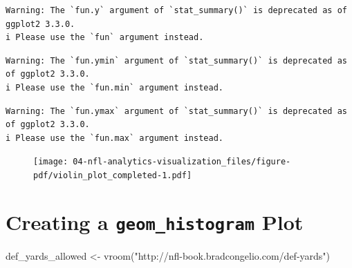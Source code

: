 \documentclass[
  letterpaper,
]{krantz}
\newenvironment{Shaded}{\begin{snugshade}}{\end{snugshade}}
\newcommand{\FunctionTok}[1]{\textcolor[rgb]{0.28,0.35,0.67}{#1}}
\newcommand{\NormalTok}[1]{\textcolor[rgb]{0.00,0.23,0.31}{#1}}
\newcommand{\OtherTok}[1]{\textcolor[rgb]{0.00,0.23,0.31}{#1}}
\newcommand{\StringTok}[1]{\textcolor[rgb]{0.13,0.47,0.30}{#1}}
\begin{document}
\begin{verbatim}
Warning: The `fun.y` argument of `stat_summary()` is deprecated as of ggplot2 3.3.0.
i Please use the `fun` argument instead.
\end{verbatim}

\begin{verbatim}
Warning: The `fun.ymin` argument of `stat_summary()` is deprecated as of ggplot2 3.3.0.
i Please use the `fun.min` argument instead.
\end{verbatim}

\begin{verbatim}
Warning: The `fun.ymax` argument of `stat_summary()` is deprecated as of ggplot2 3.3.0.
i Please use the `fun.max` argument instead.
\end{verbatim}

\begin{figure}[H]

{\centering \texttt{[image: 04-nfl-analytics-visualization\_files/figure-pdf/violin\_plot\_completed-1.pdf]}

}

\end{figure}

\hypertarget{creating-a-geom_histogram-plot}{%
\section{\texorpdfstring{Creating a \texttt{geom\_histogram}
Plot}{Creating a geom\_histogram Plot}}\label{creating-a-geom_histogram-plot}}

\begin{Shaded}
\begin{Highlighting}[]
\NormalTok{def\_yards\_allowed }\OtherTok{\textless{}{-}} \FunctionTok{vroom}\NormalTok{(}\StringTok{"http://nfl{-}book.bradcongelio.com/def{-}yards"}\NormalTok{)}
\end{Highlighting}
\end{Shaded}
\end{document}
